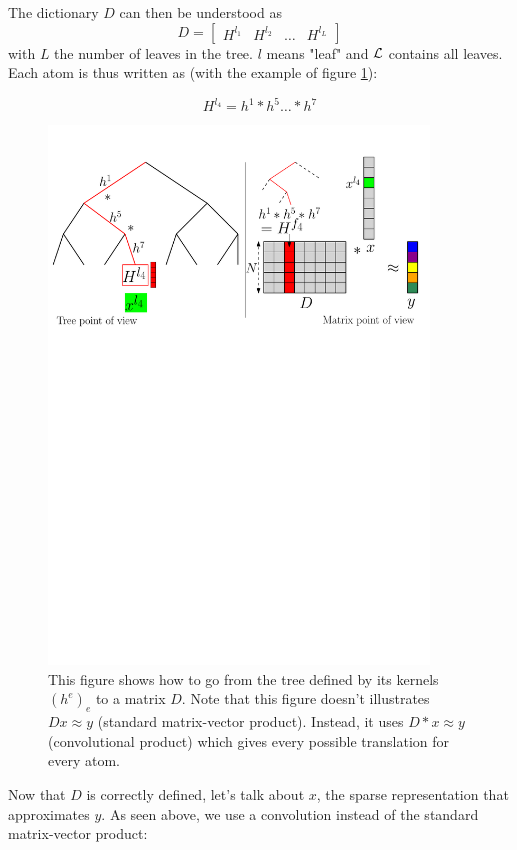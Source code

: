 The dictionary $D$ can then be understood as
$$D = \begin{bmatrix}H^{l_1} & H^{l_2} & \dots & H^{l_L}\end{bmatrix}$$
with $L$ the number of leaves in the tree. $l$ means "leaf" and $\mathcal L$ contains all leaves. Each atom is thus written as (with the example of figure \ref{fig_matrix_vs_tree}):

$$H^{l_4} = h^1 * h^5 \dots * h^7$$

\begin{figure}[!h] \centering
\includegraphics[width=0.9\textwidth]{figures/matrix-vs-tree.pdf} \caption{This figure shows how to go from the tree defined by its kernels $(h^e)_e$ to a matrix $D$. Note that this figure doesn't illustrates $Dx \approx y$ (standard matrix-vector product). Instead, it uses $D*x\approx y$ (convolutional product) which gives every possible translation for every atom.  \label{fig_matrix_vs_tree}}
\end{figure}
Now that $D$ is correctly defined, let's talk about $x$, the sparse representation that approximates $y$. As seen above, we use a convolution instead of the standard matrix-vector product:

